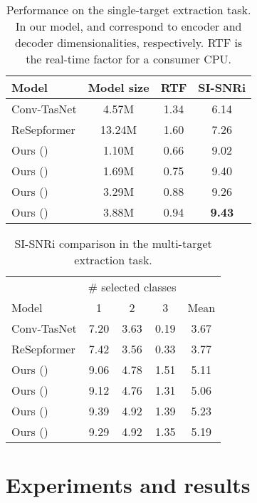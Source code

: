 



\begin{table}
\caption{Performance on the single-target extraction task. In our model,  and  correspond to encoder and decoder dimensionalities, respectively. RTF is the real-time factor for a consumer  CPU.}
\vspace{-.8em}
\centering
\begin{tabular}{lccc}
\toprule
Model                   & Model size & RTF  & SI-SNRi  \\
\midrule
Conv-TasNet              & 4.57M      & 1.34 & 6.14    \\
ReSepformer             & 13.24M     & 1.60 & {7.26}    \\
Ours () & 1.10M      & 0.66 & 9.02    \\
Ours () & 1.69M      & 0.75 & 9.40    \\
Ours () & 3.29M      & 0.88 & 9.26    \\
Ours () & 3.88M      & 0.94 & \textbf{9.43}    \\
\bottomrule
\end{tabular}
\label{table:single_target}
\end{table}



\begin{table}[t!]
\caption{SI-SNRi  comparison in the multi-target extraction task.}
\vspace{-.8em}
\centering

\begin{tabular}{l  c c c c}
\toprule
 & \multicolumn{3}{c}{\# selected classes} \\
Model                   & 1 & 2  & 3 & Mean \\
\midrule
Conv-TasNet              & 7.20 & 3.63 & 0.19 & 3.67 \\
ReSepformer              & 7.42 & 3.56 & 0.33 & 3.77 \\
Ours ()  & 9.06 & 4.78 & 1.51 & 5.11 \\
Ours ()  & 9.12 & 4.76 & 1.31 & 5.06 \\
Ours ()  & 9.39 & 4.92 & 1.39 & 5.23 \\
Ours ()  & 9.29 & 4.92 & 1.35 & 5.19 \\
\bottomrule
\end{tabular}
\vskip -0.15in
\label{table:multi_target}
\end{table}



\section{Experiments and results}








